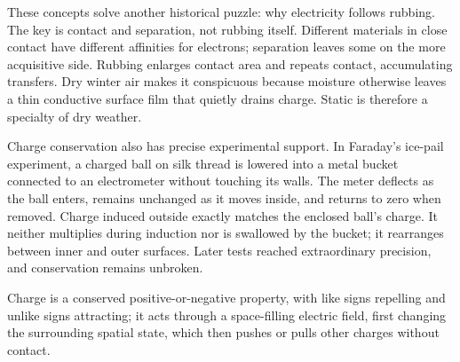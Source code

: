 \begin{mainline}
These concepts solve another historical puzzle: why electricity follows rubbing. The key is contact and separation, not rubbing itself. Different materials in close contact have different affinities for electrons; separation leaves some on the more acquisitive side. Rubbing enlarges contact area and repeats contact, accumulating transfers. Dry winter air makes it conspicuous because moisture otherwise leaves a thin conductive surface film that quietly drains charge. Static is therefore a specialty of dry weather.

Charge conservation also has precise experimental support. In Faraday's ice-pail experiment, a charged ball on silk thread is lowered into a metal bucket connected to an electrometer without touching its walls. The meter deflects as the ball enters, remains unchanged as it moves inside, and returns to zero when removed. Charge induced outside exactly matches the enclosed ball's charge. It neither multiplies during induction nor is swallowed by the bucket; it rearranges between inner and outer surfaces. Later tests reached extraordinary precision, and conservation remains unbroken.
\end{mainline}


\begin{oneline}
Charge is a conserved positive-or-negative property, with like signs repelling and unlike signs attracting; it acts through a space-filling electric field, first changing the surrounding spatial state, which then pushes or pulls other charges without contact.
\end{oneline}


